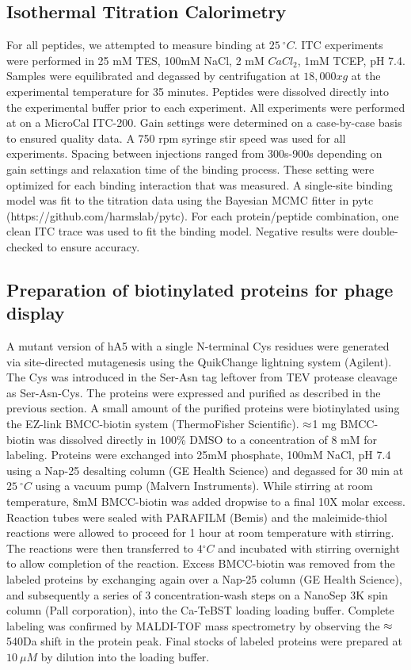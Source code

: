 \subsection{Isothermal Titration Calorimetry}

For all peptides, we attempted to measure binding at $25\ ^{\circ}C.$
ITC experiments were performed in 25 mM TES, 100mM NaCl, 2 mM $CaCl_{2}$,
1mM TCEP, pH 7.4. Samples were equilibrated and degassed by centrifugation
at $18,000xg$ at the experimental temperature for 35 minutes. Peptides
were dissolved directly into the experimental buffer prior to each
experiment. All experiments were performed at on a MicroCal ITC-200.
Gain settings were determined on a case-by-case basis to ensured quality
data. A 750 rpm syringe stir speed was used for all experiments. Spacing
between injections ranged from 300s-900s depending on gain settings
and relaxation time of the binding process. These setting were optimized
for each binding interaction that was measured. A single-site binding
model was fit to the titration data using the Bayesian MCMC fitter
in pytc (https://github.com/harmslab/pytc). For each protein/peptide
combination, one clean ITC trace was used to fit the binding model.
Negative results were double-checked to ensure accuracy.

\subsection{Preparation of biotinylated proteins for phage display}

A mutant version of hA5 with a single N-terminal Cys residues were
generated via site-directed mutagenesis using the QuikChange lightning
system (Agilent). The Cys was introduced in the Ser-Asn tag leftover
from TEV protease cleavage as Ser-Asn-Cys. The proteins were expressed
and purified as described in the previous section. A small amount
of the purified proteins were biotinylated using the EZ-link BMCC-biotin
system (ThermoFisher Scientific). $\text{\ensuremath{\approx}}$1
mg BMCC-biotin was dissolved directly in 100\% DMSO to a concentration
of 8 mM for labeling. Proteins were exchanged into 25mM phosphate,
100mM NaCl, pH 7.4 using a Nap-25 desalting column (GE Health Science)
and degassed for 30 min at $25\ ^{\circ}C$ using a vacuum pump (Malvern
Instruments). While stirring at room temperature, 8mM BMCC-biotin
was added dropwise to a final 10X molar excess. Reaction tubes were
sealed with PARAFILM (Bemis) and the maleimide-thiol reactions were
allowed to proceed for 1 hour at room temperature with stirring. The
reactions were then transferred to $4{^\circ}C$ and incubated with
stirring overnight to allow completion of the reaction. Excess BMCC-biotin
was removed from the labeled proteins by exchanging again over a Nap-25
column (GE Health Science), and subsequently a series of 3 concentration-wash
steps on a NanoSep 3K spin column (Pall corporation), into the Ca-TeBST
loading loading buffer. Complete labeling was confirmed by MALDI-TOF
mass spectrometry by observing the $\text{\ensuremath{\approx}}$540Da
shift in the protein peak. Final stocks of labeled proteins were prepared
at $10\ \mu M$ by dilution into the loading buffer. 

